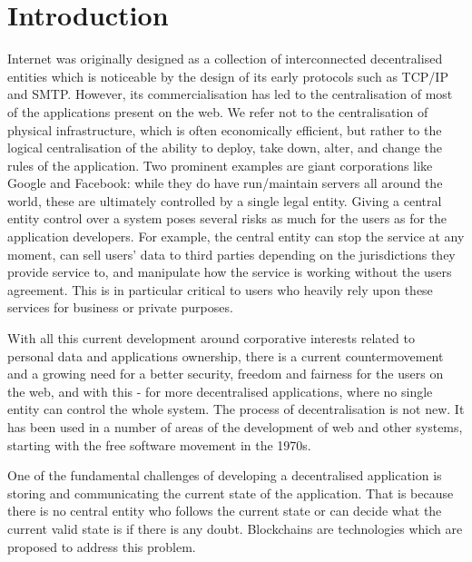 \section{Introduction}\label{sec:intro}
Internet was originally designed as a collection of interconnected decentralised entities which is noticeable by the design of its early protocols such as TCP/IP and SMTP. However, its commercialisation has led to the centralisation of most of the applications present on the web. We refer not to the centralisation of physical infrastructure, which is often economically efficient, but rather to the logical centralisation of the ability to deploy, take down, alter, and change the rules of the application. Two prominent examples are giant corporations like Google and Facebook: while they do have run/maintain servers all around the world, these are ultimately controlled by a single legal entity. Giving a central entity control over a system poses several risks as much for the users as for the application developers. For example, the central entity can stop the service at any moment, can sell users' data to third parties depending on the jurisdictions they provide service to, and manipulate how the service is working without the users agreement. This is in particular critical to users who heavily rely upon these services for business or private purposes. 

With all this current development around corporative interests related to personal data and applications ownership, there is a current countermovement and a growing need for a better security, freedom and fairness for the users on the web, and with this - for more decentralised applications, where no single entity can control the whole system. The process of decentralisation is not new. It has been used in a number of areas of the development of web and other systems, starting with the free software movement in the 1970s. %

One of the fundamental challenges of developing a decentralised application is storing and communicating the current state of the application. That is because there is no central entity who follows the current state or can decide what the current valid state is if there is any doubt. Blockchains are technologies which are proposed to address this problem.


